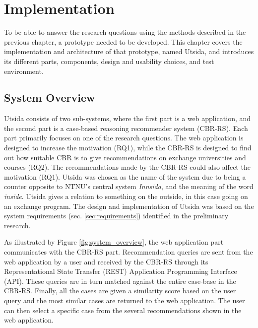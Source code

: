 
\chapter{Implementation}\label{ch5:implementation}

To be able to answer the research questions using the methods described in the previous chapter, a prototype needed to be developed. This chapter covers the implementation and architecture of that prototype, named Utsida, and introduces its different parts, components, design and usability choices, and test environment.

\section{System Overview}

Utsida consists of two sub-systems, where the first part is a web application, and the second part is a case-based reasoning recommender system (CBR-RS). Each part primarily focuses on one of the research questions. The web application is designed to increase the motivation (RQ1), while the CBR-RS is designed to find out how suitable CBR is to give recommendations on exchange universities and courses (RQ2). The recommendations made by the CBR-RS could also affect the motivation (RQ1). Utsida was chosen as the name of the system due to being a counter opposite to NTNU's central system \emph{Innsida}, and the meaning of the word \emph{inside}. Utsida gives a relation to something on the outside, in this case going on an exchange program. The design and implementation of Utsida was based on the system requirements (sec. \ref{sec:requirements}) identified in the preliminary research.

As illustrated by Figure \ref{fig:system_overview}, the web application part communicates with the CBR-RS part. Recommendation queries are sent from the web application by a user and received by the CBR-RS through its Representational State Transfer (REST) Application Programming Interface (API). These queries are in turn matched against the entire case-base in the CBR-RS. Finally, all the cases are given a similarity score based on the user query and the most similar cases are returned to the web application. The user can then select a specific case from the several recommendations shown in the web application.

